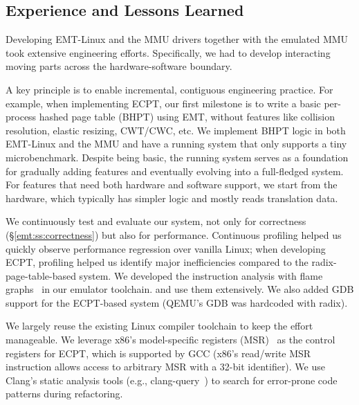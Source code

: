 \subsection{Experience and Lessons Learned}
\label{emt:sec:lessons}

\noindent
Developing EMT-Linux and the MMU drivers together with 
    the emulated MMU
    took extensive engineering efforts.
Specifically, we had to develop interacting moving parts 
    across the hardware-software boundary.

A key principle
    is to enable incremental, contiguous engineering practice.
For example, when implementing ECPT, 
    our first milestone is to write a basic per-process hashed page table (BHPT)
    using EMT, without features like collision resolution,
    elastic resizing, CWT/CWC, etc.
We implement BHPT logic in both EMT-Linux and the MMU and have a running system 
    that only supports a tiny microbenchmark.
Despite being basic, the running system serves as a foundation for gradually
    adding features and eventually evolving into a full-fledged system.
For features that need both hardware and software support,
    we start from the hardware, which typically has simpler logic
    and mostly reads translation data.

We continuously test and evaluate our system, not only 
    for correctness (\S\ref{emt:ss:correctness}) but also for performance.
Continuous profiling helped us quickly observe performance regression over vanilla Linux;
    when developing ECPT, profiling helped us identify major inefficiencies compared 
    to the radix-page-table-based system. 
We developed the instruction analysis 
    with flame graphs~\cite{tool:flamegraph} in our emulator toolchain. %
    and use them extensively. %
We also added GDB support for the ECPT-based system
    (QEMU's GDB was hardcoded with radix).

We largely reuse the existing Linux compiler toolchain to keep the effort manageable.
We leverage x86's model-specific registers (MSR)~\cite{intel:man} as the control registers for ECPT,
    which is supported by GCC (x86's read/write MSR instruction allows access 
    to arbitrary MSR with a 32-bit identifier).
We use Clang's static analysis tools (e.g., clang-query~\cite{tool:clang:query}) to search for
    error-prone code patterns during refactoring.

